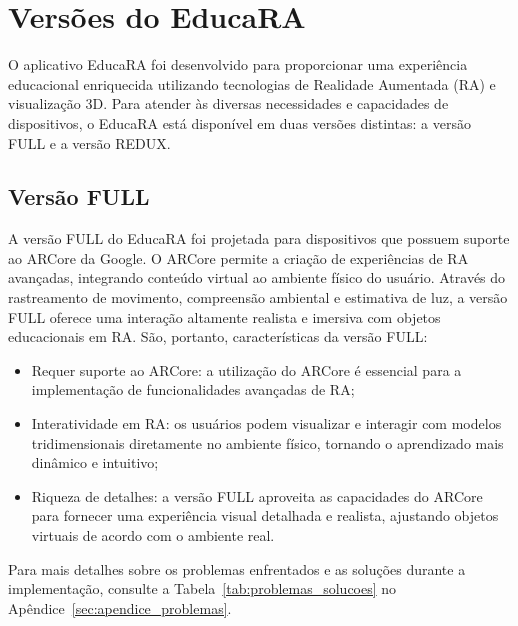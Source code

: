 \documentclass[12pt]{article}
\begin{document}
\section{Versões do EducaRA}\label{sec:versoes-educara}

O aplicativo EducaRA foi desenvolvido para proporcionar uma experiência educacional enriquecida utilizando tecnologias de Realidade Aumentada (RA) e visualização 3D. Para atender às diversas necessidades e capacidades de dispositivos, o EducaRA está  disponível em duas versões distintas: a versão FULL e a versão REDUX.

\subsection{Versão FULL}

A versão FULL do EducaRA foi projetada para dispositivos que possuem suporte ao ARCore da Google. O ARCore permite a criação de experiências de RA avançadas, integrando conteúdo virtual ao ambiente físico do usuário. Através do rastreamento de movimento, compreensão ambiental e estimativa de luz, a versão FULL oferece uma interação altamente realista e imersiva com objetos educacionais em RA. São, portanto, características da versão FULL:

\begin{itemize}
      \item Requer suporte ao ARCore: a utilização do ARCore é essencial para a implementação de funcionalidades avançadas de RA;
    \item Interatividade em RA: os usuários podem visualizar e interagir com modelos tridimensionais diretamente no ambiente físico, tornando o aprendizado mais dinâmico e intuitivo;
    \item Riqueza de detalhes: a versão FULL aproveita as capacidades do ARCore para fornecer uma experiência visual detalhada e realista, ajustando objetos virtuais de acordo com o ambiente real.
\end{itemize}

Para mais detalhes sobre os problemas enfrentados e as soluções durante a implementação, consulte a Tabela~\ref{tab:problemas_solucoes} no Apêndice~\ref{sec:apendice_problemas}.

\end{document}
